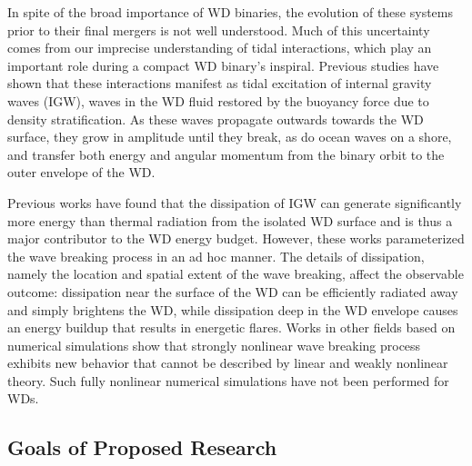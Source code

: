 \documentclass[12pt,
        usenames, %
        dvipsnames %
    ]{article}
\begin{document}
In spite of the broad importance of WD binaries, the evolution of these systems
prior to their final mergers is not well understood. Much of this uncertainty
comes from our imprecise understanding of tidal interactions, which play an
important role during a compact WD binary's inspiral\cite{fullerII}. Previous
studies have shown that these interactions manifest as tidal excitation of
internal gravity waves (IGW), waves in the WD fluid restored by the buoyancy
force due to density stratification\cite{fullerI}. As these waves propagate
outwards towards the WD surface, they grow in amplitude until they break, as do
ocean waves on a shore, and transfer both energy and angular momentum from the
binary orbit to the outer envelope of the WD\cite{fullerI,fullerII}.

Previous works have found that the dissipation of IGW can generate significantly
more energy than thermal radiation from the isolated WD surface and is thus a
major contributor to the WD energy budget\cite{fullerII,fullerIV}. However,
these works parameterized the wave breaking process in an ad hoc manner. The
details of dissipation, namely the location and spatial extent of the wave
breaking, affect the observable outcome: dissipation near the surface of the WD
can be efficiently radiated away and simply brightens the WD, while dissipation
deep in the WD envelope causes an energy buildup that results in energetic
flares\cite{tidal_novae}. Works in other fields based on numerical simulations
show that strongly nonlinear wave breaking process exhibits new behavior that
cannot be described by linear and weakly nonlinear
theory\cite{winters1994,barker_ogilvie}. Such fully nonlinear numerical
simulations have not been performed for WDs.

\subsection{Goals of Proposed Research}
\end{document}
